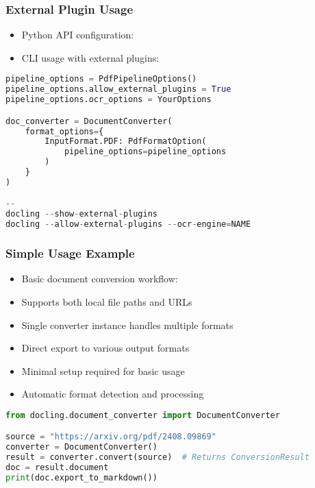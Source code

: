 \begin{frame}[fragile]\frametitle{External Plugin Usage}
    \begin{itemize}
	\item Python API configuration:
	\item CLI usage with external plugins:
	\end{itemize}
	
\begin{lstlisting}[language=Python, basicstyle=\tiny]
pipeline_options = PdfPipelineOptions()
pipeline_options.allow_external_plugins = True
pipeline_options.ocr_options = YourOptions

doc_converter = DocumentConverter(
    format_options={
        InputFormat.PDF: PdfFormatOption(
            pipeline_options=pipeline_options
        )
    }
)

--
docling --show-external-plugins
docling --allow-external-plugins --ocr-engine=NAME
\end{lstlisting}
\end{frame}

\begin{frame}[fragile]\frametitle{Simple Usage Example}
      \begin{itemize}
	\item Basic document conversion workflow:
	\item Supports both local file paths and URLs
	\item Single converter instance handles multiple formats
	\item Direct export to various output formats
	\item Minimal setup required for basic usage
	\item Automatic format detection and processing
	  \end{itemize}
	  
\begin{lstlisting}[language=Python, basicstyle=\tiny]
from docling.document_converter import DocumentConverter

source = "https://arxiv.org/pdf/2408.09869"
converter = DocumentConverter()
result = converter.convert(source)  # Returns ConversionResult
doc = result.document
print(doc.export_to_markdown())
\end{lstlisting}	  
\end{frame}

